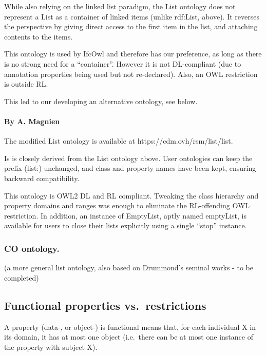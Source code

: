 \documentclass[
  11pt,
]{article}
\begin{document}
While also relying on the linked list paradigm, the List ontology does
not represent a List as a container of linked items (unlike rdf:List,
above). It reverses the perspective by giving direct access to the first
item in the list, and attaching contents to the items.

This ontology is used by IfcOwl and therefore has our preference, as
long as there is no strong need for a ``container''. However it is not
DL-compliant (due to annotation properties being used but not
re-declared). Also, an OWL restriction is outside RL.

This led to our developing an alternative ontology, see below.

\hypertarget{by-a.-magnien}{%
\paragraph{By A. Magnien}\label{by-a.-magnien}}

The modified List ontology is available at
https://cdm.ovh/rsm/list/list.

Is is closely derived from the List ontology above. User ontologies can
keep the prefix (list:) unchanged, and class and property names have
been kept, ensuring backward compatibility.

This ontology is OWL2 DL and RL compliant. Tweaking the class hierarchy
and property domains and ranges was enough to eliminate the RL-offending
OWL restriction. In addition, an instance of EmptyList, aptly named
emptyList, is available for users to close their lists explicitly using
a single ``stop'' instance.

\hypertarget{co-ontology.}{%
\subsubsection{CO ontology.}\label{co-ontology.}}

(a more general list ontology, also based on Drummond's seminal works -
to be completed)

\hypertarget{functional-properties-vs.-restrictions}{%
\subsection{Functional properties
vs.~restrictions}\label{functional-properties-vs.-restrictions}}

A property (data-, or object-) is functional means that, for each
individual X in its domain, it has at most one object (i.e.~there can be
at most one instance of the property with subject X).
\end{document}
